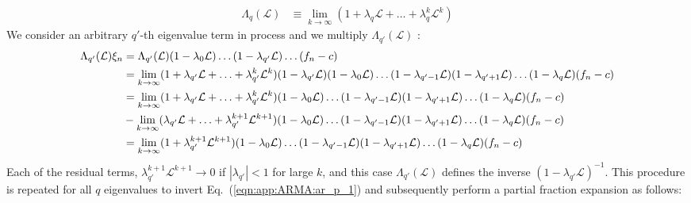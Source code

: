 \begin{align}
\Lambda_q(\mathcal{L}) & \equiv \lim_{k\to \infty} (1 + \lambda_q \mathcal{L} + \hdots + \lambda_q^k\mathcal{L}^k) \label{eqn:app:AR_inverse_0}
\end{align}
We consider an arbitrary $q'$-th eigenvalue term in process and we multiply $\Lambda_{q'}(\mathcal{L})$ :
\begin{align}
 \Lambda_{q'}(\mathcal{L}) \xi_n &= 
 \Lambda_{q'}(\mathcal{L}) (1 - \lambda_{0} \mathcal{L}) \hdots (1 - \lambda_{q'} \mathcal{L}) \hdots(f_n - c) \\
 & = \lim_{k\to \infty} (1 + \lambda_{q'} \mathcal{L} + \hdots + \lambda_{q'}^k\mathcal{L}^k)  (1 - \lambda_{q'} \mathcal{L})(1 - \lambda_{0} \mathcal{L}) \hdots (1 - \lambda_{q'-1} \mathcal{L})  (1 - \lambda_{q'+1} \mathcal{L}) \hdots(1 - \lambda_{q} \mathcal{L})(f_n - c) \\
 & = \lim_{k\to \infty} (1 + \lambda_{q'} \mathcal{L} + \hdots + \lambda_{q'}^k\mathcal{L}^k)(1 - \lambda_{0} \mathcal{L}) \hdots (1 - \lambda_{q'-1} \mathcal{L})  (1 - \lambda_{q'+1} \mathcal{L}) \hdots(1 - \lambda_{q} \mathcal{L})(f_n - c) \\
  & - \lim_{k\to \infty} (\lambda_{q'} \mathcal{L} + \hdots + \lambda_{q'}^{k+1}\mathcal{L}^{k+1})(1 - \lambda_{0} \mathcal{L}) \hdots (1 - \lambda_{q'-1} \mathcal{L})  (1 - \lambda_{q'+1} \mathcal{L}) \hdots(1 - \lambda_{q} \mathcal{L})(f_n - c) \\
& = \lim_{k\to \infty}(1 + \lambda_{q'}^{k+1}\mathcal{L}^{k+1}) (1 - \lambda_{0} \mathcal{L}) \hdots (1 - \lambda_{q'-1} \mathcal{L})  (1 - \lambda_{q'+1} \mathcal{L})\hdots (1 - \lambda_{q} \mathcal{L})(f_n - c)
\end{align}
Each of the residual terms,  $\lambda_{q'}^{k+1}\mathcal{L}^{k+1} \to 0 $ if $|\lambda_{q'}| < 1$  for large $k$, and this case $\Lambda_{q'}(\mathcal{L})$ defines the inverse $(1 - \lambda_{q'} \mathcal{L})^{-1}$. This procedure is repeated for all $q$ eigenvalues to invert Eq.~(\ref {eqn:app:ARMA:ar_p_1}) and subsequently perform a partial fraction expansion as follows:
